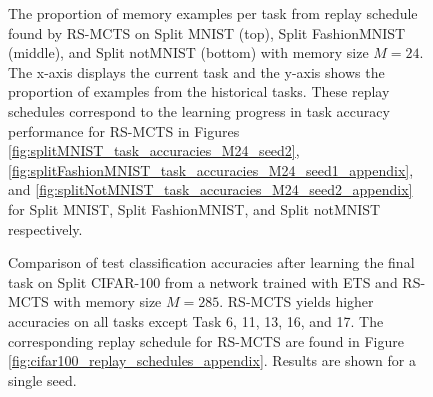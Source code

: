 \begin{figure}[t]
\centering
\setlength{\figwidth}{0.85\columnwidth}
\setlength{\figheight}{.15\textheight}



\caption{The proportion of memory examples per task from replay schedule found by RS-MCTS on Split MNIST (top), Split FashionMNIST (middle), and Split notMNIST (bottom) with memory size $M=24$. The x-axis displays the current task and the y-axis shows the proportion of examples from the historical tasks. These replay schedules correspond to the learning progress in task accuracy performance for RS-MCTS in Figures \ref{fig:splitMNIST_task_accuracies_M24_seed2}, \ref{fig:splitFashionMNIST_task_accuracies_M24_seed1_appendix}, and \ref{fig:splitNotMNIST_task_accuracies_M24_seed2_appendix} for Split MNIST, Split FashionMNIST, and Split notMNIST respectively. }\vspace{-3mm}
\label{fig:replay_schedules_proportion_for_mnist_fashionmnist_notmnist}
\end{figure}

\begin{figure*}[t]
\centering
\setlength{\figwidth}{0.65\textwidth}
\setlength{\figheight}{0.6\columnwidth}

\vspace{-10pt}
\caption{Comparison of test classification accuracies after learning the final task on Split CIFAR-100 from a network trained with ETS and RS-MCTS with memory size $M=285$. RS-MCTS yields higher accuracies on all tasks except Task 6, 11, 13, 16, and 17. The corresponding replay schedule for RS-MCTS are found in Figure \ref{fig:cifar100_replay_schedules_appendix}. Results are shown for a single seed.}
\label{fig:splitCifar100_task_accuracy_seed5_barplot_appendix}
\end{figure*}


